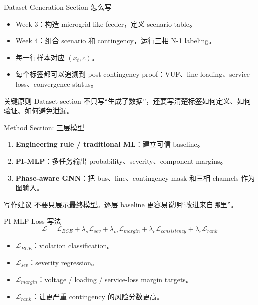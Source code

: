 \documentclass[aspectratio=169,11pt]{beamer}
\begin{document}
\begin{frame}{Dataset Generation Section 怎么写}
\begin{itemize}
  \item Week 3：构造 microgrid-like feeder，定义 scenario table。
  \item Week 4：组合 scenario 和 contingency，运行三相 N-1 labeling。
  \item 每一行样本对应 $(x_t,c)$。
  \item 每个标签都可以追溯到 post-contingency proof：VUF、line loading、service-loss、convergence status。
\end{itemize}
\begin{block}{关键原则}
Dataset section 不只写“生成了数据”，还要写清楚标签如何定义、如何验证、如何避免泄漏。
\end{block}
\end{frame}

\begin{frame}{Method Section: 三层模型}
\begin{enumerate}
  \item \textbf{Engineering rule / traditional ML}：建立可信 baseline。
  \item \textbf{PI-MLP}：多任务输出 probability、severity、component margins。
  \item \textbf{Phase-aware GNN}：把 bus、line、contingency mask 和三相 channels 作为图输入。
\end{enumerate}
\begin{alertblock}{写作建议}
不要只展示最终模型。逐层 baseline 更容易说明“改进来自哪里”。
\end{alertblock}
\end{frame}

\begin{frame}{PI-MLP Loss 写法}
\[
\mathcal{L}=
\mathcal{L}_{BCE}
+\lambda_s\mathcal{L}_{sev}
+\lambda_m\mathcal{L}_{margin}
+\lambda_c\mathcal{L}_{consistency}
+\lambda_r\mathcal{L}_{rank}
\]
\begin{itemize}
  \item $\mathcal{L}_{BCE}$：violation classification。
  \item $\mathcal{L}_{sev}$：severity regression。
  \item $\mathcal{L}_{margin}$：voltage / loading / service-loss margin targets。
  \item $\mathcal{L}_{rank}$：让更严重 contingency 的风险分数更高。
\end{itemize}
\end{frame}
\end{document}
